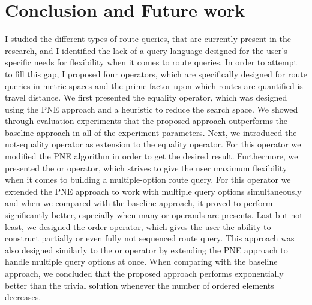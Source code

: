 \chapter{Conclusion and Future work}
\label{sec:conclusion}

I studied the different types of route queries, that are currently present in the research, and I identified the lack of a query language designed for the user's specific needs for flexibility when it comes to route queries. In order to attempt to fill this gap, I proposed four operators, which are specifically designed for route queries in metric spaces and the prime factor upon which routes are quantified is travel distance. 
We first presented the equality operator, which was designed using the PNE approach \cite{OSR} and a heuristic to reduce the search space. We showed through evaluation experiments that the proposed approach outperforms the baseline approach in all of the experiment parameters. Next, we introduced the not-equality operator as extension to the equality operator. For this operator we modified the PNE algorithm in order to get the desired result. Furthermore, we presented the or operator, which strives to give the user maximum flexibility when it comes to building a multiple-option route query. For this operator we extended the PNE approach to work with multiple query options simultaneously and when we compared with the baseline approach, it proved to perform significantly better, especially when many or operands are presents. Last but not least, we designed the order operator, which gives the user the ability to construct partially or even fully not sequenced route query. This approach was also designed similarly to the or operator by extending the PNE approach to handle multiple query options at once. When comparing with the baseline approach, we concluded that the proposed approach performs exponentially better than the trivial solution whenever the number of ordered elements decreases.


